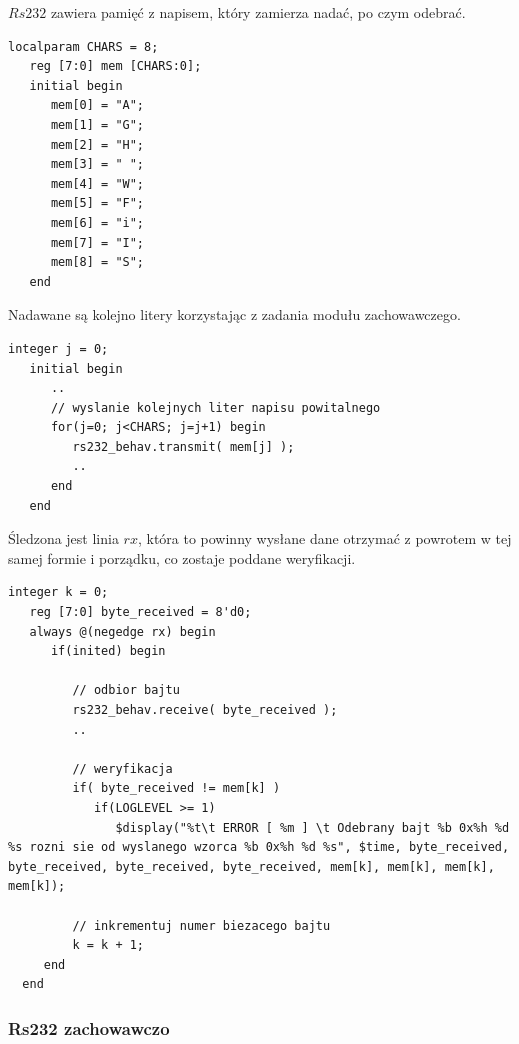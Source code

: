 \documentclass[a4paper,12pt]{article}
\begin{document}
$Rs232$ zawiera pamięć z napisem, który zamierza nadać, po czym odebrać.
\begin{lstlisting}[label=sim/Rs232,caption=sim/Rs232.v,firstnumber=28]
   localparam CHARS = 8;
   reg [7:0] mem [CHARS:0];
   initial begin
      mem[0] = "A";
      mem[1] = "G";
      mem[2] = "H";
      mem[3] = " ";
      mem[4] = "W";
      mem[5] = "F";
      mem[6] = "i";
      mem[7] = "I";
      mem[8] = "S";
   end
\end{lstlisting}

Nadawane są kolejno litery korzystając z zadania modułu zachowawczego.
\begin{lstlisting}[label=sim/Rs232,caption=sim/Rs232.v,firstnumber=42]
   integer j = 0;
   initial begin
      ..
      // wyslanie kolejnych liter napisu powitalnego
      for(j=0; j<CHARS; j=j+1) begin
         rs232_behav.transmit( mem[j] );
         ..
      end
   end
\end{lstlisting}

Śledzona jest linia $rx$, która to powinny wysłane dane otrzymać z powrotem w tej samej formie i porządku, co zostaje poddane weryfikacji.
\begin{lstlisting}[label=sim/Rs232,caption=sim/Rs232.v,firstnumber=64]
   integer k = 0;
   reg [7:0] byte_received = 8'd0;
   always @(negedge rx) begin
      if(inited) begin

         // odbior bajtu
         rs232_behav.receive( byte_received );
         ..

         // weryfikacja
         if( byte_received != mem[k] )
            if(LOGLEVEL >= 1)
               $display("%t\t ERROR [ %m ] \t Odebrany bajt %b 0x%h %d %s rozni sie od wyslanego wzorca %b 0x%h %d %s", $time, byte_received, byte_received, byte_received, byte_received, mem[k], mem[k], mem[k], mem[k]);

         // inkrementuj numer biezacego bajtu
         k = k + 1;
     end
  end
\end{lstlisting}


\subsubsection{Rs232 zachowawczo}
\end{document}
